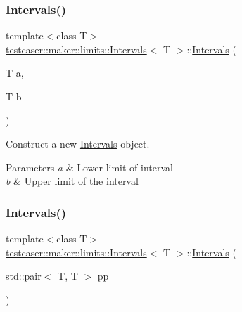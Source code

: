 \subsubsection{\texorpdfstring{Intervals()}{Intervals()}\hspace{0.1cm}{\footnotesize\ttfamily [1/2]}}
{\footnotesize\ttfamily template$<$class T$>$ \\
\hyperlink{structtestcaser_1_1maker_1_1limits_1_1Intervals}{testcaser\+::maker\+::limits\+::\+Intervals}$<$ T $>$\+::\hyperlink{structtestcaser_1_1maker_1_1limits_1_1Intervals}{Intervals} (\begin{DoxyParamCaption}\item[{T}]{a,  }\item[{T}]{b }\end{DoxyParamCaption})\hspace{0.3cm}{\ttfamily [inline]}}



Construct a new \hyperlink{structtestcaser_1_1maker_1_1limits_1_1Intervals}{Intervals} object. 


\begin{DoxyParams}{Parameters}
{\em a} & Lower limit of interval \\
\hline
{\em b} & Upper limit of the interval \\
\hline
\end{DoxyParams}
\mbox{\label{structtestcaser_1_1maker_1_1limits_1_1Intervals_ad899dc031cbffd5247b9b39e23577a52}} 
\subsubsection{\texorpdfstring{Intervals()}{Intervals()}\hspace{0.1cm}{\footnotesize\ttfamily [2/2]}}
{\footnotesize\ttfamily template$<$class T$>$ \\
\hyperlink{structtestcaser_1_1maker_1_1limits_1_1Intervals}{testcaser\+::maker\+::limits\+::\+Intervals}$<$ T $>$\+::\hyperlink{structtestcaser_1_1maker_1_1limits_1_1Intervals}{Intervals} (\begin{DoxyParamCaption}\item[{std\+::pair$<$ T, T $>$}]{pp }\end{DoxyParamCaption})\hspace{0.3cm}{\ttfamily [inline]}}



